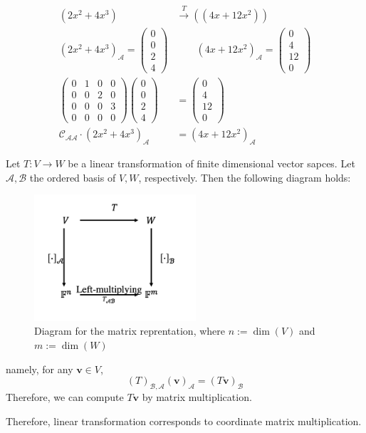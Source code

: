 \begin{example}
\begin{align*}
(2x^2+4x^3)&\xrightarrow{T} ((4x+12x^2))\\
(2x^2+4x^3)_{\mathcal{A}}
=
\begin{pmatrix}
0\\0\\2\\4
\end{pmatrix}&\qquad
(4x+12x^2)_{\mathcal{A}}
=
\begin{pmatrix}
0\\4\\12\\0
\end{pmatrix}\\
\begin{pmatrix}
0&1&0&0\\0&0&2&0\\0&0&0&3\\0&0&0&0
\end{pmatrix}\begin{pmatrix}
0\\0\\2\\4
\end{pmatrix}&=\begin{pmatrix}
0\\4\\12\\0
\end{pmatrix}\\
\mathcal{C}_{\mathcal{A}\mathcal{A}}\cdot
(2x^2+4x^3)_{\mathcal{A}}
&=
(4x+12x^2)_{\mathcal{A}}
\end{align*}
\end{example}

\begin{theorem}\label{The:3:3}
Let $T:V\to W$ be a linear transformation of finite dimensional vector sapces. Let $\mathcal{A},\mathcal{B}$ the ordered basis of $V,W$, respectively.
Then the following diagram holds:
\begin{figure}[H]
\centering
\includegraphics[width=6cm]{week3/p_2}
\caption{Diagram for the matrix reprentation, where $n:=\dim(V)$ and $m:=\dim(W)$}
\end{figure}
namely, for any $\bm v\in V$,
\[
(T)_{\mathcal{B},\mathcal{A}}(\bm v)_{\mathcal{A}}
=
(T\bm v)_{\mathcal{B}}
\]
Therefore, we can compute $T\bm v$ by matrix multiplication.
\end{theorem}
Therefore, linear transformation corresponds to coordinate matrix multiplication.

